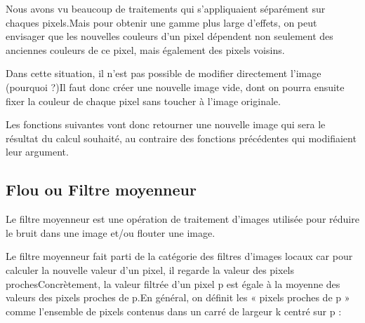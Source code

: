 \documentclass[letterpaper,10pt,english]{jupyterBook}
\begin{document}
\sphinxAtStartPar
Nous avons vu beaucoup de traitements qui s’appliquaient séparément sur chaques
pixels.Mais pour obtenir une gamme plus large d’effets, on peut envisager que les nouvelles couleurs d’un pixel dépendent non seulement des anciennes couleurs de ce pixel, mais
également des pixels voisins.

\sphinxAtStartPar
Dans cette situation, il n’est pas possible de modifier directement l’image (pourquoi ?)Il faut donc créer une nouvelle image vide, dont on pourra ensuite fixer la couleur de chaque pixel sans toucher à l’image originale.

\sphinxAtStartPar
Les fonctions suivantes vont donc retourner une nouvelle image qui sera le résultat du
calcul souhaité, au contraire des fonctions précédentes qui modifiaient leur argument.


\subsection{Flou ou Filtre moyenneur}
\label{\detokenize{notebooks/images/TRAITEMENT-DES-IMAGES:flou-ou-filtre-moyenneur}}
\sphinxAtStartPar
Le filtre moyenneur est une opération de traitement d’images utilisée pour réduire le bruit dans une image et/ou flouter une image.

\sphinxAtStartPar
Le filtre moyenneur fait parti de la catégorie des filtres d’images locaux car pour calculer la nouvelle valeur d’un pixel, il regarde la valeur des pixels prochesConcrètement, la valeur filtrée d’un pixel p est égale à la moyenne des valeurs des pixels proches de p.En général, on définit les « pixels proches de p » comme l’ensemble de pixels contenus dans un carré de largeur k centré sur p :
\end{document}

